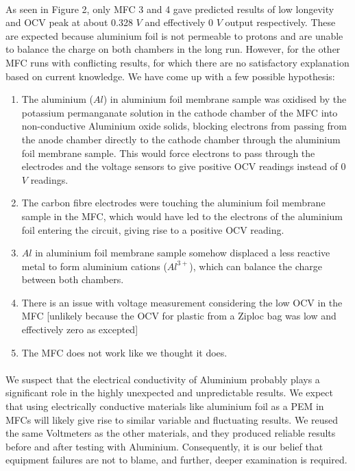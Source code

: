 \documentclass[12pt, twocolumn, a4paper]{article}
\begin{document}
    \paragraph{}As seen in Figure 2, only MFC 3 and 4 gave predicted results of low longevity and OCV peak at about 0.328 $V$ and effectively 0 $V$ output respectively. These are expected because aluminium foil is not permeable to protons and are unable to balance the charge on both chambers in the long run. However, for the other MFC runs with conflicting results, for which there are no satisfactory explanation based on current knowledge. We have come up with a few possible hypothesis: 
    \begin{enumerate}
        \item The aluminium ($Al$) in aluminium foil membrane sample was oxidised by the potassium permanganate solution in the cathode chamber of the MFC into non-conductive Aluminium oxide solids, blocking electrons from passing from the anode chamber directly to the cathode chamber through the aluminium foil membrane sample. This would force electrons to pass through the electrodes and the voltage sensors to give positive OCV readings instead of 0 $V$ readings.
        \item The carbon fibre electrodes were touching the aluminium foil membrane sample in the MFC, which would have led to the electrons of the aluminium foil entering the circuit, giving rise to a positive OCV reading.
        \item $Al$ in aluminium foil membrane sample somehow displaced a less reactive metal to form aluminium cations ($Al^{3+}$), which can balance the charge between both chambers. 
        \item There is an issue with voltage measurement considering the low OCV in the MFC [unlikely because the OCV for plastic from a Ziploc bag was low and effectively zero as excepted]
        \item The MFC does not work like we thought it does.
    \end{enumerate}
\paragraph{}We suspect that the electrical conductivity of Aluminium probably plays a significant role in the highly unexpected and unpredictable results. We expect that using electrically conductive materials like aluminium foil as a PEM in MFCs will likely give rise to similar variable and fluctuating results. We reused the same Voltmeters as the other materials, and they produced reliable results before and after testing with Aluminium. Consequently, it is our belief that equipment failures are not to blame, and further, deeper examination is required.
\end{document}
